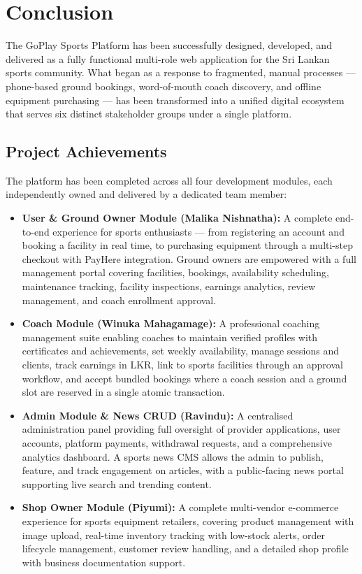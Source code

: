 \documentclass[12pt,a4paper]{report}
\begin{document}
\chapter{Conclusion}

The GoPlay Sports Platform has been successfully designed, developed, and delivered as a fully functional multi-role web application for the Sri Lankan sports community. What began as a response to fragmented, manual processes — phone-based ground bookings, word-of-mouth coach discovery, and offline equipment purchasing — has been transformed into a unified digital ecosystem that serves six distinct stakeholder groups under a single platform.

\section{Project Achievements}

The platform has been completed across all four development modules, each independently owned and delivered by a dedicated team member:

\begin{itemize}[leftmargin=1.5cm]
  \item \textbf{User \& Ground Owner Module (Malika Nishnatha):} A complete end-to-end experience for sports enthusiasts — from registering an account and booking a facility in real time, to purchasing equipment through a multi-step checkout with PayHere integration. Ground owners are empowered with a full management portal covering facilities, bookings, availability scheduling, maintenance tracking, facility inspections, earnings analytics, review management, and coach enrollment approval.

  \item \textbf{Coach Module (Winuka Mahagamage):} A professional coaching management suite enabling coaches to maintain verified profiles with certificates and achievements, set weekly availability, manage sessions and clients, track earnings in LKR, link to sports facilities through an approval workflow, and accept bundled bookings where a coach session and a ground slot are reserved in a single atomic transaction.

  \item \textbf{Admin Module \& News CRUD (Ravindu):} A centralised administration panel providing full oversight of provider applications, user accounts, platform payments, withdrawal requests, and a comprehensive analytics dashboard. A sports news CMS allows the admin to publish, feature, and track engagement on articles, with a public-facing news portal supporting live search and trending content.

  \item \textbf{Shop Owner Module (Piyumi):} A complete multi-vendor e-commerce experience for sports equipment retailers, covering product management with image upload, real-time inventory tracking with low-stock alerts, order lifecycle management, customer review handling, and a detailed shop profile with business documentation support.
\end{itemize}
\end{document}
